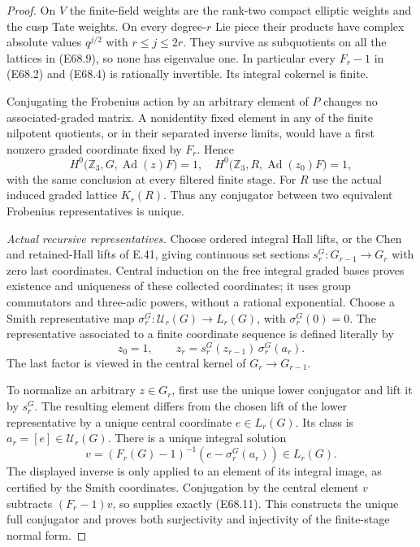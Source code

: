\begin{proof}
On $V$ the finite-field weights are the rank-two compact
elliptic weights and the cusp Tate weights. On every
degree-$r$ Lie piece their products have complex absolute
values $q^{j/2}$ with $r\le j\le2r$. They survive as
subquotients on all the lattices in (E68.9), so none
has eigenvalue one. In particular every $F_r-1$ in
(E68.2) and (E68.4) is rationally invertible. Its integral
cokernel is finite.

Conjugating the Frobenius action by an arbitrary element
of $P$ changes no associated-graded matrix. A nonidentity
fixed element in any of the finite nilpotent quotients,
or in their separated inverse limits, would have a first
nonzero graded coordinate fixed by $F_r$. Hence
\[
 H^0\bigl(\mathbb Z_3,G,\operatorname{Ad}(z)F\bigr)=1,
 \quad
 H^0\bigl(\mathbb Z_3,R,\operatorname{Ad}(z_0)F\bigr)=1,
 \tag{E68.10}
\]
with the same conclusion at every filtered finite stage.
For $R$ use the actual induced graded lattice $K_r(R)$.
Thus any conjugator between two equivalent Frobenius
representatives is unique.

\emph{Actual recursive representatives.}
Choose ordered integral Hall lifts, or the Chen and
retained-Hall lifts of E.41, giving continuous set sections
$s_r^G:G_{r-1}\to G_r$ with zero last coordinates.
Central induction on the free integral graded bases
proves existence and uniqueness of these collected
coordinates; it uses group commutators and three-adic
powers, without a rational exponential.
Choose a Smith representative map
$\sigma_r^G:\mathcal U_r(G)\to L_r(G)$, with
$\sigma_r^G(0)=0$.
The representative associated to a finite coordinate
sequence is defined literally by
\[
 z_0=1,\qquad
 z_r=s_r^G(z_{r-1})\,\sigma_r^G(a_r).
 \tag{E68.11}
\]
The last factor is viewed in the central kernel of
$G_r\to G_{r-1}$.

To normalize an arbitrary $z\in G_r$, first use the
unique lower conjugator and lift it by $s_r^G$.
The resulting element differs from the chosen lift
of the lower representative by a unique central
coordinate $e\in L_r(G)$.
Its class is $a_r=[e]\in\mathcal U_r(G)$.
There is a unique integral solution
\[
       v=(F_r(G)-1)^{-1}
                      (e-\sigma_r^G(a_r))\in L_r(G).
 \tag{E68.12}
\]
The displayed inverse is only applied to an element
of its integral image, as certified by the Smith
coordinates. Conjugation by the central element $v$
subtracts $(F_r-1)v$, so supplies exactly (E68.11).
This constructs the unique full conjugator and proves
both surjectivity and injectivity of the finite-stage
normal form.


\end{proof}
